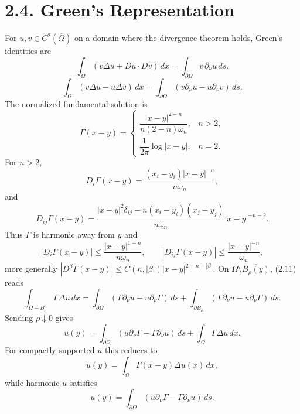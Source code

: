 \section*{2.4. Green's Representation}

For $u,v\in C^2(\overline\Omega)$ on a domain where the divergence theorem
holds, Green's identities are
\begin{equation}
\tag{2.10}
\int_\Omega(v\Delta u+Du\mathbin{\cdot}Dv)\,dx
 =\int_{\partial\Omega}v\,\partial_\nu u\,ds.
\end{equation}
\begin{equation}
\tag{2.11}
\int_\Omega(v\Delta u-u\Delta v)\,dx
 =\int_{\partial\Omega}(v\partial_\nu u-u\partial_\nu v)\,ds.
\end{equation}
The normalized fundamental solution is
\begin{equation}
\tag{2.12}
\Gamma(x-y)=
\begin{cases}
\dfrac{|x-y|^{2-n}}{n(2-n)\omega_n},&n>2,\\
\dfrac{1}{2\pi}\log|x-y|,&n=2.
\end{cases}
\end{equation}
For $n>2$,
\[
D_i\Gamma(x-y)=\frac{(x_i-y_i)|x-y|^{-n}}{n\omega_n},
\]
and
\begin{equation}
\tag{2.13}
D_{ij}\Gamma(x-y)=\frac{|x-y|^2\delta_{ij}-n(x_i-y_i)(x_j-y_j)}{n\omega_n}|x-y|^{-n-2}.
\end{equation}
Thus $\Gamma$ is harmonic away from $y$ and
\begin{equation}
\tag{2.14}
|D_i\Gamma(x-y)|\leq\frac{|x-y|^{1-n}}{n\omega_n},
\qquad
|D_{ij}\Gamma(x-y)|\leq\frac{|x-y|^{-n}}{\omega_n},
\end{equation}
more generally $|D^\beta\Gamma(x-y)|\leq
C(n,|\beta|)|x-y|^{2-n-|\beta|}$. On
$\Omega\setminus\overline{B_\rho(y)}$, (2.11) reads
\begin{equation}
\tag{2.15}
\int_{\Omega-B_\rho}\Gamma\Delta u\,dx
=\int_{\partial\Omega}(\Gamma\partial_\nu u-u\partial_\nu\Gamma)\,ds
+\int_{\partial B_\rho}(\Gamma\partial_\nu u-u\partial_\nu\Gamma)\,ds.
\end{equation}
Sending $\rho\downarrow0$ gives
\begin{equation}
\tag{2.16}
u(y)=\int_{\partial\Omega}
\left(u\partial_\nu\Gamma-\Gamma\partial_\nu u\right)\,ds
+\int_\Omega\Gamma\Delta u\,dx.
\end{equation}
For compactly supported $u$ this reduces to
\begin{equation}
\tag{2.17}
u(y)=\int_\Omega\Gamma(x-y)\Delta u(x)\,dx,
\end{equation}
while harmonic $u$ satisfies
\begin{equation}
\tag{2.18}
u(y)=\int_{\partial\Omega}
(u\partial_\nu\Gamma-\Gamma\partial_\nu u)\,ds.
\end{equation}

